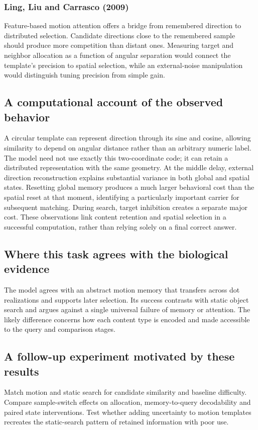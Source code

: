\documentclass[11pt]{article}
\begin{document}
\subsubsection{Ling, Liu and Carrasco (2009)}
Feature-based motion attention offers a bridge from remembered direction to distributed selection. Candidate directions close to the remembered sample should produce more competition than distant ones. Measuring target and neighbor allocation as a function of angular separation would connect the template’s precision to spatial selection, while an external-noise manipulation would distinguish tuning precision from simple gain. \cite{bio_ling}

\subsection{A computational account of the observed behavior}
A circular template can represent direction through its sine and cosine, allowing similarity to depend on angular distance rather than an arbitrary numeric label. The model need not use exactly this two-coordinate code; it can retain a distributed representation with the same geometry. At the middle delay, external direction reconstruction explains substantial variance in both global and spatial states. Resetting global memory produces a much larger behavioral cost than the spatial reset at that moment, identifying a particularly important carrier for subsequent matching. During search, target inhibition creates a separate major cost. These observations link content retention and spatial selection in a successful computation, rather than relying solely on a final correct answer. \cite{bio_wolfe}

\subsection{Where this task agrees with the biological evidence}
The model agrees with an abstract motion memory that transfers across dot realizations and supports later selection. Its success contrasts with static object search and argues against a single universal failure of memory or attention. The likely difference concerns how each content type is encoded and made accessible to the query and comparison stages.

\subsection{A follow-up experiment motivated by these results}
Match motion and static search for candidate similarity and baseline difficulty. Compare sample-switch effects on allocation, memory-to-query decodability and paired state interventions. Test whether adding uncertainty to motion templates recreates the static-search pattern of retained information with poor use.
\end{document}

